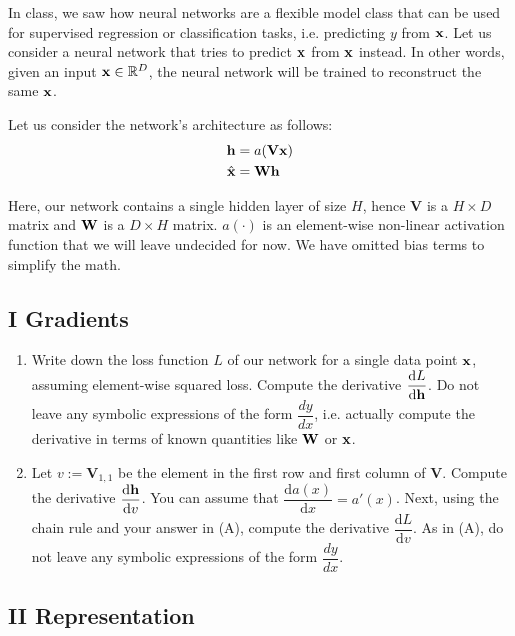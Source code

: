 \documentclass[11pt]{article}
\begin{document}
In class, we saw how neural networks are a flexible model class that can be used for supervised regression or classification tasks, i.e. predicting $y$ from ${\mathbf x}$. Let us consider a neural network that tries to predict ${\mathbf x}$ from ${\mathbf x}$ instead. In other words, given an input ${\mathbf x} \in \mathbb{R}^D$, the neural network will be trained to reconstruct the same ${\mathbf x}$.\\

\newcommand{\bV}{\mathbf{V}}

\noindent Let us consider the network's architecture as follows:
\begin{align*}
    \bh &= a(\bV \bx)\\
    \hat{\bx} &= \bW \bh
\end{align*}

\noindent Here, our network contains a single hidden layer of size $H$, hence $\bV$ is a $H \times D$ matrix and ${\mathbf W}$ is a $D \times H$ matrix. $a(\cdot)$ is an element-wise non-linear activation function that we will leave undecided for now. We have omitted bias terms to simplify the math.\\

\subsection*{I \quad Gradients}

\begin{enumerate}[label=(\Alph*)]

    \item Write down the loss function $L$ of our network for a single data point ${\mathbf x}$, assuming element-wise squared loss. Compute the derivative $\dfrac{\text{d}L}{\text{d}{\mathbf h}}$. Do not leave any symbolic expressions of the form $\dfrac{dy}{dx}$, i.e. actually compute the derivative in terms of known quantities like ${\mathbf W}$ or ${\mathbf x}$.
    
    
    \item Let $v := \bV_{1,1}$ be the element in the first row and first column of $\bV$. Compute the derivative $\dfrac{\text{d}{\mathbf h}}{\text{d}v}$. You can assume that $\dfrac{\text{d}a(x)}{\text{d}x} = a'(x)$. Next, using the chain rule and your answer in (A), compute the derivative $\dfrac{\text{d}L}{\text{d}v}$. As in (A), do not leave any symbolic expressions of the form $\dfrac{dy}{dx}$.
    
\end{enumerate}

\subsection*{II \quad Representation}
\end{document}
